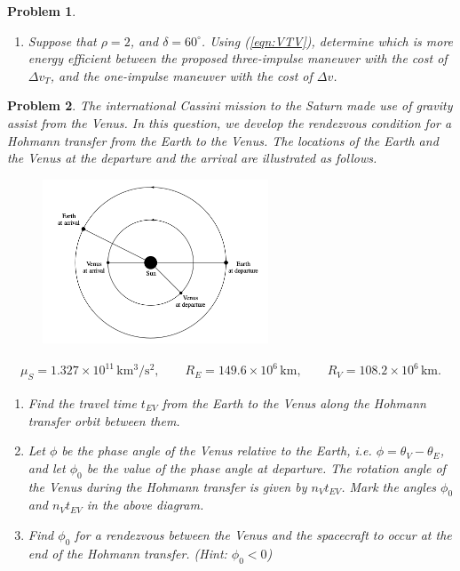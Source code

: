 \documentclass[10pt]{article}
\newcommand{\refeqn}[1]{(\ref{eqn:#1})}
\theoremstyle{plain}\theorembodyfont{\normalfont}
\newtheorem{prob}{Problem}[section]
\renewcommand{\theprob}{\arabic{prob}}
\newenvironment{subprob}%
{\renewcommand{\theenumi}{\alph{enumi}}\renewcommand{\labelenumi}{(\theenumi)}\begin{enumerate}}%
{\end{enumerate}}%
\begin{document}
\begin{prob}
\begin{subprob}

\item Suppose that $\rho=2$, and $\delta=60^\circ$. Using \refeqn{VTV}, determine which is more energy efficient between the proposed three-impulse maneuver with the cost of $\Delta v_T$, and the one-impulse maneuver with the cost of $\Delta v$. 

\end{subprob}

\end{prob}



\clearpage\newpage
\renewcommand{\theprob}{\arabic{prob} \textit{(15pt)}}
\begin{prob}
The international Cassini mission to the Saturn made use of gravity assist from the Venus. In this question, we develop the rendezvous condition for a Hohmann transfer from the Earth to the Venus. The locations of the Earth and the Venus at the departure and the arrival are illustrated as follows.

\begin{figure}[htbp]
    \centering
    \includegraphics[width=0.6\textwidth]{figures/prob5.png}
\end{figure}

\begin{align*}
\mu_S = 1.327\times 10^{11}\,\mathrm{km^3/s^2},\qquad R_E=149.6\times 10^6\,\mathrm{km},\qquad R_V=108.2\times 10^6\,\mathrm{km}.
\end{align*}

\begin{subprob}
\item Find the travel time $t_{EV}$ from the Earth to the Venus along the Hohmann transfer orbit between them.
\vspace*{4cm}
\item Let $\phi$ be the phase angle of the Venus relative to the Earth, i.e. $\phi=\theta_V-\theta_E$, and let $\phi_0$ be the value of the phase angle at departure. The rotation angle of the Venus during the Hohmann transfer is given by $n_V t_{EV}$. Mark the angles $\phi_0$ and $n_V t_{EV}$ in the above diagram.
\item Find $\phi_0$ for a rendezvous between the Venus and the spacecraft to occur at the end of the Hohmann transfer. (Hint: $\phi_0<0$)
\end{subprob}

\end{prob}
\end{document}
